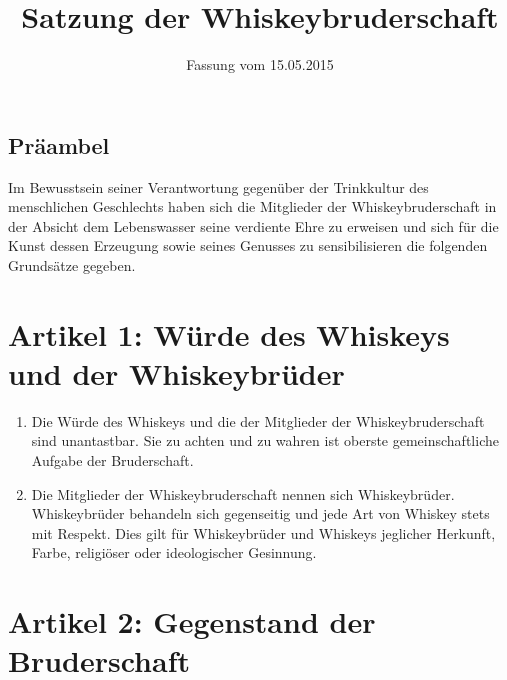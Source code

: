 \documentclass[a4paper,12pt]{article}
\title{Satzung der Whiskeybruderschaft}
\date{Fassung vom 15.05.2015}
\begin{document}
\maketitle

\clearpage

\begin{center}
\section*{Präambel}
Im Bewusstsein seiner Verantwortung gegenüber der Trinkkultur des menschlichen Geschlechts haben
sich die Mitglieder der Whiskeybruderschaft in der Absicht dem Lebenswasser seine verdiente Ehre zu
erweisen und sich für die Kunst dessen Erzeugung sowie seines Genusses zu sensibilisieren die
folgenden Grundsätze gegeben.
\end{center}

\clearpage



\section*{Artikel 1: Würde des Whiskeys und der Whiskeybrüder}

\begin{enumerate}

\item Die Würde des Whiskeys und die der Mitglieder der Whiskeybruderschaft sind unantastbar. Sie zu
  achten und zu wahren ist oberste gemeinschaftliche Aufgabe der Bruderschaft.

\item Die Mitglieder der Whiskeybruderschaft nennen sich Whiskeybrüder. Whiskeybrüder behandeln sich
  gegenseitig und jede Art von Whiskey stets mit Respekt. Dies gilt für Whiskeybrüder und Whiskeys
  jeglicher Herkunft, Farbe, religiöser oder ideologischer Gesinnung.

\end{enumerate}



\section*{Artikel 2: Gegenstand der Bruderschaft}
\end{document}
